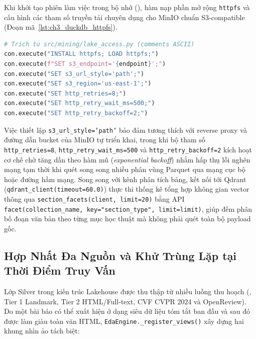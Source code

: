 Khi khởi tạo phiên làm việc trong bộ nhớ (), hàm  nạp phần mở rộng \texttt{httpfs} và cấu hình các tham số truyền tải chuyên dụng cho MinIO chuẩn S3-compatible (Đoạn mã~\ref{lst:ch3_duckdb_httpfs}).

\begin{lstlisting}[language=Python, caption={Cau hinh DuckDB httpfs va co che thu lai khi doc Parquet tu MinIO S3}, label={lst:ch3_duckdb_httpfs}]
# Trich tu src/mining/lake_access.py (comments ASCII)
con.execute("INSTALL httpfs; LOAD httpfs;")
con.execute(f"SET s3_endpoint='{endpoint}';")
con.execute("SET s3_url_style='path';")
con.execute("SET s3_region='us-east-1';")
con.execute("SET http_retries=8;")
con.execute("SET http_retry_wait_ms=500;")
con.execute("SET http_retry_backoff=2;")
\end{lstlisting}

Việc thiết lập \texttt{s3\_url\_style='path'} bảo đảm tương thích với reverse proxy và đường dẫn bucket của MinIO tự triển khai, trong khi bộ tham số \texttt{http\_retries=8}, \texttt{http\_retry\_wait\_ms=500} và \texttt{http\_retry\_backoff=2} kích hoạt cơ chế chờ tăng dần theo hàm mũ (\textit{exponential backoff}) nhằm hấp thụ lỗi nghẽn mạng tạm thời khi quét song song nhiều phân vùng Parquet qua mạng cục bộ hoặc đường hầm mạng. Song song với kênh phân tích bảng, kết nối tới Qdrant (\texttt{qdrant\_client(timeout=60.0)}) thực thi thống kê tổng hợp không gian vector thông qua \texttt{section\_facets(client, limit=20)} bằng API \texttt{facet(collection\_name, key="section\_type", limit=limit)}, giúp đếm phân bố đoạn văn bản theo từng mục học thuật mà không phải quét toàn bộ payload gốc.

\subsection{Hợp Nhất Đa Nguồn và Khử Trùng Lặp tại Thời Điểm Truy Vấn}
\label{sec:ch3_views}

Lớp Silver trong kiến trúc Lakehouse được thu thập từ nhiều luồng thu hoạch (, Tier 1 Landmark, Tier 2 HTML/Full-text, CVF CVPR 2024 và OpenReview). Do một bài báo có thể xuất hiện ở dạng siêu dữ liệu tóm tắt ban đầu và sau đó được làm giàu toàn văn HTML, \texttt{EdaEngine.\_register\_views()} xây dựng hai khung nhìn ảo tách biệt:


